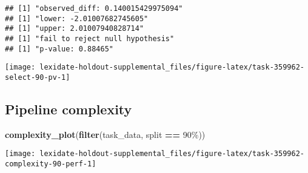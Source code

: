 \documentclass[
]{book}
\newenvironment{Shaded}{\begin{snugshade}}{\end{snugshade}}
\newcommand{\AttributeTok}[1]{\textcolor[rgb]{0.13,0.29,0.53}{#1}}
\newcommand{\DecValTok}[1]{\textcolor[rgb]{0.00,0.00,0.81}{#1}}
\newcommand{\FunctionTok}[1]{\textcolor[rgb]{0.13,0.29,0.53}{\textbf{#1}}}
\newcommand{\NormalTok}[1]{#1}
\newcommand{\OtherTok}[1]{\textcolor[rgb]{0.56,0.35,0.01}{#1}}
\newcommand{\SpecialCharTok}[1]{\textcolor[rgb]{0.81,0.36,0.00}{\textbf{#1}}}
\newcommand{\StringTok}[1]{\textcolor[rgb]{0.31,0.60,0.02}{#1}}
\begin{document}
\begin{Shaded}
\end{Shaded}

\begin{verbatim}
## [1] "observed_diff: 0.140015429975094"
## [1] "lower: -2.01007682745605"
## [1] "upper: 2.01007940828714"
## [1] "fail to reject null hypothesis"
## [1] "p-value: 0.88465"
\end{verbatim}

\texttt{[image: lexidate-holdout-supplemental\_files/figure-latex/task-359962-select-90-pv-1]}

\hypertarget{pipeline-complexity-51}{%
\subsection{Pipeline complexity}\label{pipeline-complexity-51}}

\begin{Shaded}
\begin{Highlighting}[]
\FunctionTok{complexity\_plot}\NormalTok{(}\FunctionTok{filter}\NormalTok{(task\_data, split }\SpecialCharTok{==} \StringTok{\textquotesingle{}90\%\textquotesingle{}}\NormalTok{))}
\end{Highlighting}
\end{Shaded}

\texttt{[image: lexidate-holdout-supplemental\_files/figure-latex/task-359962-complexity-90-perf-1]}
\end{document}
